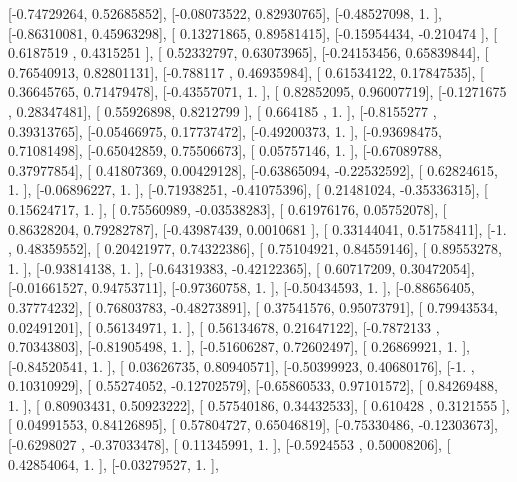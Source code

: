 \documentclass{article}
\begin{document}
       [-0.74729264,  0.52685852],
       [-0.08073522,  0.82930765],
       [-0.48527098,  1.        ],
       [-0.86310081,  0.45963298],
       [ 0.13271865,  0.89581415],
       [-0.15954434, -0.210474  ],
       [ 0.6187519 ,  0.4315251 ],
       [ 0.52332797,  0.63073965],
       [-0.24153456,  0.65839844],
       [ 0.76540913,  0.82801131],
       [-0.788117  ,  0.46935984],
       [ 0.61534122,  0.17847535],
       [ 0.36645765,  0.71479478],
       [-0.43557071,  1.        ],
       [ 0.82852095,  0.96007719],
       [-0.1271675 ,  0.28347481],
       [ 0.55926898,  0.8212799 ],
       [ 0.664185  ,  1.        ],
       [-0.8155277 ,  0.39313765],
       [-0.05466975,  0.17737472],
       [-0.49200373,  1.        ],
       [-0.93698475,  0.71081498],
       [-0.65042859,  0.75506673],
       [ 0.05757146,  1.        ],
       [-0.67089788,  0.37977854],
       [ 0.41807369,  0.00429128],
       [-0.63865094, -0.22532592],
       [ 0.62824615,  1.        ],
       [-0.06896227,  1.        ],
       [-0.71938251, -0.41075396],
       [ 0.21481024, -0.35336315],
       [ 0.15624717,  1.        ],
       [ 0.75560989, -0.03538283],
       [ 0.61976176,  0.05752078],
       [ 0.86328204,  0.79282787],
       [-0.43987439,  0.0010681 ],
       [ 0.33144041,  0.51758411],
       [-1.        ,  0.48359552],
       [ 0.20421977,  0.74322386],
       [ 0.75104921,  0.84559146],
       [ 0.89553278,  1.        ],
       [-0.93814138,  1.        ],
       [-0.64319383, -0.42122365],
       [ 0.60717209,  0.30472054],
       [-0.01661527,  0.94753711],
       [-0.97360758,  1.        ],
       [-0.50434593,  1.        ],
       [-0.88656405,  0.37774232],
       [ 0.76803783, -0.48273891],
       [ 0.37541576,  0.95073791],
       [ 0.79943534,  0.02491201],
       [ 0.56134971,  1.        ],
       [ 0.56134678,  0.21647122],
       [-0.7872133 ,  0.70343803],
       [-0.81905498,  1.        ],
       [-0.51606287,  0.72602497],
       [ 0.26869921,  1.        ],
       [-0.84520541,  1.        ],
       [ 0.03626735,  0.80940571],
       [-0.50399923,  0.40680176],
       [-1.        ,  0.10310929],
       [ 0.55274052, -0.12702579],
       [-0.65860533,  0.97101572],
       [ 0.84269488,  1.        ],
       [ 0.80903431,  0.50923222],
       [ 0.57540186,  0.34432533],
       [ 0.610428  ,  0.3121555 ],
       [ 0.04991553,  0.84126895],
       [ 0.57804727,  0.65046819],
       [-0.75330486, -0.12303673],
       [-0.6298027 , -0.37033478],
       [ 0.11345991,  1.        ],
       [-0.5924553 ,  0.50008206],
       [ 0.42854064,  1.        ],
       [-0.03279527,  1.        ],
\end{document}
